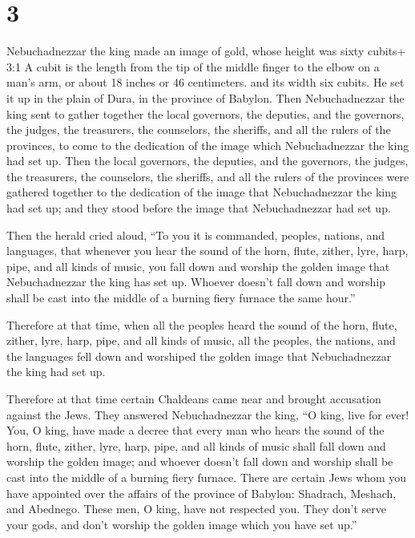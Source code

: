 \hypertarget{section-2}{%
\section{3}\label{section-2}}

 Nebuchadnezzar the king made an image of gold, whose height
was sixty cubits+ 3:1 A cubit is the length from the tip of the middle
finger to the elbow on a man's arm, or about 18 inches or 46
centimeters. and its width six cubits. He set it up in the plain of
Dura, in the province of Babylon.  Then Nebuchadnezzar the
king sent to gather together the local governors, the deputies, and the
governors, the judges, the treasurers, the counselors, the sheriffs, and
all the rulers of the provinces, to come to the dedication of the image
which Nebuchadnezzar the king had set up.  Then the local
governors, the deputies, and the governors, the judges, the treasurers,
the counselors, the sheriffs, and all the rulers of the provinces were
gathered together to the dedication of the image that Nebuchadnezzar the
king had set up; and they stood before the image that Nebuchadnezzar had
set up.

 Then the herald cried aloud, ``To you it is commanded,
peoples, nations, and languages,  that whenever you hear the
sound of the horn, flute, zither, lyre, harp, pipe, and all kinds of
music, you fall down and worship the golden image that Nebuchadnezzar
the king has set up.  Whoever doesn't fall down and worship
shall be cast into the middle of a burning fiery furnace the same
hour.''

 Therefore at that time, when all the peoples heard the
sound of the horn, flute, zither, lyre, harp, pipe, and all kinds of
music, all the peoples, the nations, and the languages fell down and
worshiped the golden image that Nebuchadnezzar the king had set up.

 Therefore at that time certain Chaldeans came near and
brought accusation against the Jews.  They answered
Nebuchadnezzar the king, ``O king, live for ever!  You, O
king, have made a decree that every man who hears the sound of the horn,
flute, zither, lyre, harp, pipe, and all kinds of music shall fall down
and worship the golden image;  and whoever doesn't fall
down and worship shall be cast into the middle of a burning fiery
furnace.  There are certain Jews whom you have appointed
over the affairs of the province of Babylon: Shadrach, Meshach, and
Abednego. These men, O king, have not respected you. They don't serve
your gods, and don't worship the golden image which you have set up.''

